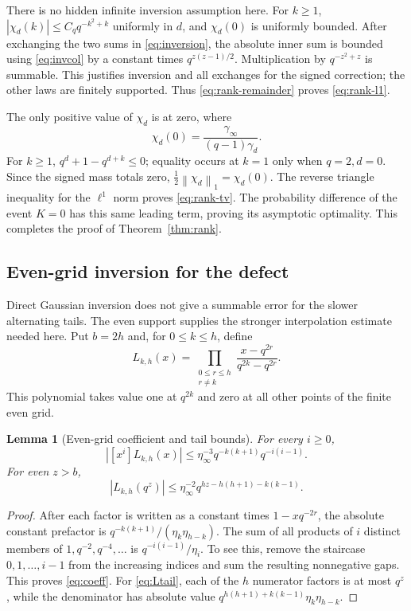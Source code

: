 \documentclass[11pt,letterpaper]{article}
\newtheorem{lemma}[theorem]{Lemma}
\theoremstyle{remark}
\newcommand{\norm}[1]{\left\lVert #1\right\rVert}
\begin{document}
There is no hidden infinite inversion assumption here. For $k\ge1$,
$|\chi_d(k)|\le C_q q^{-k^2+k}$ uniformly in $d$, and $\chi_d(0)$ is
uniformly bounded. After exchanging the two sums in \eqref{eq:inversion},
the absolute inner sum is bounded using \eqref{eq:invcol} by a constant
times $q^{z(z-1)/2}$. Multiplication by $q^{-z^2+z}$ is summable.
This justifies inversion and all exchanges for the signed correction;
the other laws are finitely supported. Thus \eqref{eq:rank-remainder}
proves \eqref{eq:rank-l1}.

The only positive value of $\chi_d$ is at zero, where
\[
 \chi_d(0)=\frac{\gamma_\infty}{(q-1)\gamma_d}.
\]
For $k\ge1$, $q^d+1-q^{d+k}\le0$; equality occurs at $k=1$ only when
$q=2,d=0$. Since the signed mass totals zero,
$\tfrac12\norm{\chi_d}_1=\chi_d(0)$. The reverse triangle inequality
for the $\ell^1$ norm proves \eqref{eq:rank-tv}. The probability difference
of the event $K=0$ has this same leading term, proving its asymptotic
optimality. This completes the proof of Theorem~\ref{thm:rank}.

\subsection{Even-grid inversion for the defect}

Direct Gaussian inversion does not give a summable error for the slower
alternating tails. The even support supplies the stronger interpolation
estimate needed here. Put $b=2h$ and, for $0\le k\le h$, define
\[
 L_{k,h}(x)=\prod_{\substack{0\le r\le h\\r\ne k}}
                   \frac{x-q^{2r}}{q^{2k}-q^{2r}}.
\]
This polynomial takes value one at $q^{2k}$ and zero at all other points
of the finite even grid.

\begin{lemma}[Even-grid coefficient and tail bounds]\label{lem:interpolation}
For every $i\ge0$,
\begin{equation}\label{eq:coeff}
 |[x^i]L_{k,h}(x)|
    \le\eta_\infty^{-3}q^{-k(k+1)}q^{-i(i-1)}.
\end{equation}
For even $z>b$,
\begin{equation}\label{eq:Ltail}
 |L_{k,h}(q^z)|
    \le\eta_\infty^{-2}q^{hz-h(h+1)-k(k-1)}.
\end{equation}
\end{lemma}

\begin{proof}
After each factor is written as a constant times $1-xq^{-2r}$,
the absolute constant prefactor is
$q^{-k(k+1)}/(\eta_k\eta_{h-k})$.
The sum of all products of $i$ distinct members of
$1,q^{-2},q^{-4},\ldots$ is $q^{-i(i-1)}/\eta_i$.
To see this, remove the staircase $0,1,\ldots,i-1$ from the increasing
indices and sum the resulting nonnegative gaps. This proves
\eqref{eq:coeff}. For \eqref{eq:Ltail}, each of the $h$ numerator factors
is at most $q^z$, while the denominator has absolute value
$q^{h(h+1)+k(k-1)}\eta_k\eta_{h-k}$.
\end{proof}
\end{document}
